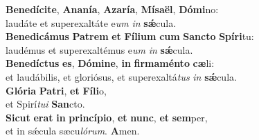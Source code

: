 \evenverse \textbf{Be}\textbf{ne}\textbf{dí}\textbf{ci}\textbf{te}, \textbf{A}\textbf{na}\textbf{ní}\textbf{a}, \textbf{A}\textbf{za}\textbf{rí}\textbf{a}, \textbf{Mí}\textbf{sa}\textbf{ël}, \textbf{Dó}\textbf{mi}no:~\*\\
\evenverse laudáte et superexaltáte e\textit{um} \textit{in} \textbf{sǽ}cula.\\
\oddverse \textbf{Be}\textbf{ne}\textbf{di}\textbf{cá}\textbf{mus} \textbf{Pa}\textbf{trem} \textbf{et} \textbf{Fí}\textbf{li}\textbf{um} \textbf{cum} \textbf{San}\textbf{cto} \textbf{Spí}\textbf{ri}tu:~\*\\
\oddverse laudémus et superexaltémus e\textit{um} \textit{in} \textbf{sǽ}cula.\\
\evenverse \textbf{Be}\textbf{ne}\textbf{dí}\textbf{ctus} \textbf{es}, \textbf{Dó}\textbf{mi}\textbf{ne}, \textbf{in} \textbf{fir}\textbf{ma}\textbf{mén}\textbf{to} \textbf{cæ}li:~\*\\
\evenverse et laudábilis, et gloriósus, et superexaltá\textit{tus} \textit{in} \textbf{sǽ}cula.\\
\oddverse \textbf{Gló}\textbf{ri}\textbf{a} \textbf{Pa}\textbf{tri}, \textbf{et} \textbf{Fí}\textbf{li}o,~\*\\
\oddverse et Spirí\textit{tu}\textit{i} \textbf{San}cto.\\
\evenverse \textbf{Si}\textbf{cut} \textbf{e}\textbf{rat} \textbf{in} \textbf{prin}\textbf{cí}\textbf{pi}\textbf{o}, \textbf{et} \textbf{nunc}, \textbf{et} \textbf{sem}per,~\*\\
\evenverse et in sǽcula sæcu\textit{ló}\textit{rum}. \textbf{A}men.\\
